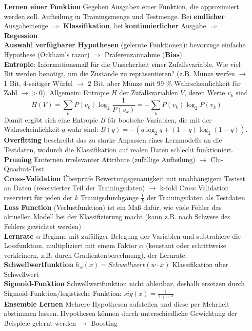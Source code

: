 \documentclass[12pt]{article}
\begin{document}
	\textbf{Lernen einer Funktion} Gegeben Ausgaben einer Funktion, die approximiert werden soll. Aufteilung in Trainingsmenge und Testmenge. Bei \textbf{endlicher} Ausgabemenge $\Rightarrow$ \textbf{Klassifikation}, bei \textbf{kontinuierlicher} Ausgabe $\Rightarrow$ \textbf{Regession}\\
	\textbf{Auswahl verfügbarer Hypothesen} (gelernte Funktionen): bevorzuge einfache Hypothese (Ockham's razor) $\Rightarrow$ Präferenzannahme (\textbf{Bias})\\
	\textbf{Entropie}: Informationsmaß für die Unsicherheit einer Zufallsvariable. Wie viel Bit werden benötigt, um die Zustände zu repräsentieren? (z.B. Münze werfen $\rightarrow$ 1 Bit, 4-seitiger Würfel $\rightarrow$ 2 Bit, aber Münze mit 99 \% Wahrscheinlichkeit für Zahl $\rightarrow > 0$). Allgemein: Entropie $H$ der Zufallsvariablen $V$, deren Werte $v_k$ sind
	$$H(V) = \sum_k P(v_k) \log_2 \frac{1}{P(v_k)} = - \sum_k P(v_k) \log_2 P(v_k)$$
	Damit ergibt sich eine Entropie $B$ für boolsche Variablen, die mit der Wahrscheinlichkeit $q$ wahr sind: $B(q) = - (q \log_2 q + (1-q) \log_2 (1-q))$.\\
	\textbf{Overfitting} beschreibt das zu starke Anpassen eines Lernmodells an die Testdaten, wodurch die Klassifikation auf realen Daten schlecht funktioniert.\\
	\textbf{Pruning} Entfernen irrelevanter Attribute (zufällige Aufteilung) $\rightarrow$ Chi-Quadrat-Test\\
	\textbf{Cross-Validation} Überprüfe Bewertungsgenauigkeit mit unabhängigem Testset an Daten (reservierter Teil der Trainingsdaten) $\rightarrow$ k-fold Cross Validation reserviert für jeden der $k$ Trainigsdurchgänge $\frac{1}{k}$ der Trainingsdaten als Testdaten\\
	\textbf{Loss Function} (Verlustfunktion) ist ein Maß dafür, wie viele Fehler das aktuellen Modell bei der Klassifizierung macht (kann z.B. nach Schwere des Fehlers gewichtet werden)\\
	\textbf{Lernrate $\alpha$} Beginne mit zufälliger Belegung der Variablen und subtrahiere die Lossfunktion, multipliziert mit einem Faktor $\alpha$ (konstant oder schrittweise verkleinern, z.B. durch Gradientenberechnung), der Lernrate.\\
	\textbf{Schwellwertfunktion} $h_w(x) = Schwellwert(w \cdot x)$ Klassifikation über Schwellwert\\
	\textbf{Sigmoid-Funktion} Schwellwertfunktion nicht ableitbar, deshalb ersetzen durch Sigmoid-Funktion/logistische Funktion: $sig(x) = \frac{1}{1 + e^{-x}}$\\
	\textbf{Ensemble Lernen} Mehrere Hypothesen aufstellen und diese per Mehrheit abstimmen lassen. Hypothesen können durch unterschiedliche Gewichtung der Beispiele gelernt werden $\rightarrow$ Boosting
	
\end{document}
